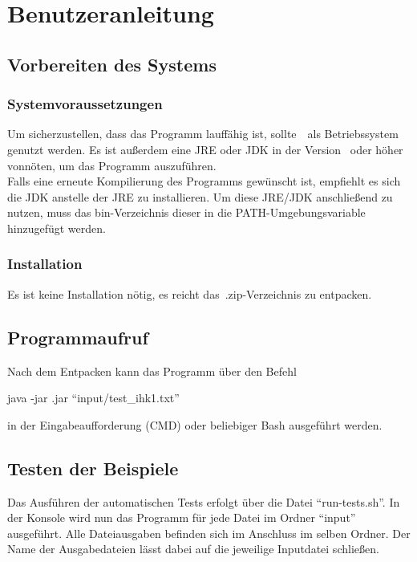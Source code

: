 \chapter{Benutzeranleitung}\label{ch:benutzeranleitung}


\section{Vorbereiten des Systems}\label{sec:vorbereiten-des-systems}

\subsection{Systemvoraussetzungen}\label{subsec:systemvoraussetzungen}
Um sicherzustellen, dass das Programm lauffähig ist, sollte~\Betriebssystem~als Betriebssystem genutzt werden.
Es ist außerdem eine JRE oder JDK in der Version \JavaVersion~oder höher vonnöten, um das Programm auszuführen.\\
Falls eine erneute Kompilierung des Programms gewünscht ist, empfiehlt es sich die JDK anstelle der JRE zu installieren.
Um diese JRE/JDK anschließend zu nutzen, muss das bin-Verzeichnis dieser in die PATH-Umgebungsvariable hinzugefügt werden.
\subsection{Installation}\label{subsec:installation}
Es ist keine Installation nötig, es reicht das~.zip-Verzeichnis zu entpacken.

\section{Programmaufruf}\label{sec:programmaufruf}
Nach dem Entpacken kann das Programm über den Befehl
\begin{center}
    \colorbox{gray!20}{
        \begin{minipage}{0.9\textwidth}
            java -jar \Artifact.jar \enquote{input/test\_ihk1.txt}
        \end{minipage}
    }
\end{center}
in der Eingabeaufforderung (CMD) oder beliebiger Bash ausgeführt werden.
\section{Testen der Beispiele}\label{sec:testen-der-beispiele}
Das Ausführen der automatischen Tests erfolgt über die Datei \enquote{run-tests.sh}.
In der Konsole wird nun das Programm für jede Datei im Ordner \enquote{input} ausgeführt.
Alle Dateiausgaben befinden sich im Anschluss im selben Ordner. Der Name der Ausgabedateien lässt dabei auf die jeweilige Inputdatei schließen.

